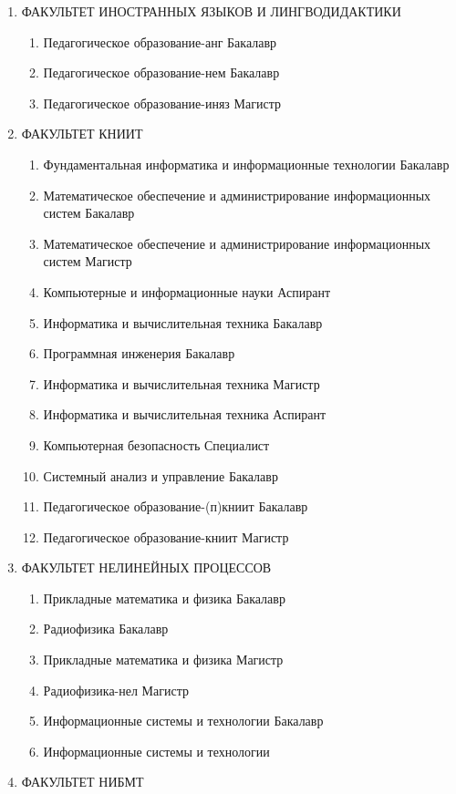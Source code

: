 \begin{enumerate}
\item ФАКУЛЬТЕТ ИНОСТРАННЫХ ЯЗЫКОВ И ЛИНГВОДИДАКТИКИ
\begin{enumerate}
\item Педагогическое образование-анг	Бакалавр
\item Педагогическое образование-нем	Бакалавр
\item Педагогическое образование-иняз	Магистр
\end{enumerate}
\item ФАКУЛЬТЕТ КНИИТ
\begin{enumerate}
\item Фундаментальная информатика и информационные технологии	Бакалавр
\item Математическое обеспечение и администрирование информационных систем	Бакалавр
\item Математическое обеспечение и администрирование информационных систем	Магистр
\item Компьютерные и информационные науки	Аспирант
\item Информатика и вычислительная техника	Бакалавр
\item Программная инженерия	Бакалавр
\item Информатика и вычислительная техника	Магистр
\item Информатика и вычислительная техника	Аспирант
\item Компьютерная безопасность	Специалист
\item Системный анализ и управление	Бакалавр
\item Педагогическое образование-(п)книит	Бакалавр
\item Педагогическое образование-книит	Магистр
\end{enumerate}
\item ФАКУЛЬТЕТ НЕЛИНЕЙНЫХ ПРОЦЕССОВ
\begin{enumerate}
\item Прикладные математика и физика	Бакалавр
\item Радиофизика	Бакалавр
\item Прикладные математика и физика	Магистр
\item Радиофизика-нел	Магистр
\item Информационные системы и технологии	Бакалавр
\item Информационные системы и технологии
\end{enumerate}
\item ФАКУЛЬТЕТ НИБМТ
\begin{enumerate}


\end{enumerate}
\end{enumerate}
